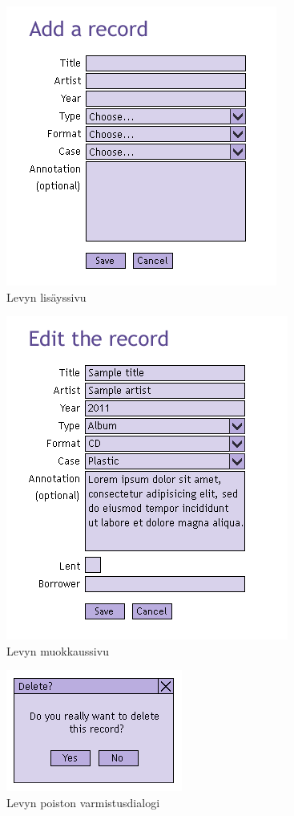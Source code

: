 \documentclass[a4paper,12pt]{report}
\begin{document}
\begin{figure}[H]
  \begin{center}
    \includegraphics[]{uidraft/addpage}
  \end{center}
  \caption{Levyn lisäyssivu}
\end{figure}

\begin{figure}[H]
  \begin{center}
    \includegraphics[]{uidraft/editpage}
  \end{center}
  \caption{Levyn muokkaussivu}
\end{figure}

\begin{figure}[H]
  \begin{center}
    \includegraphics[]{uidraft/delete}
  \end{center}
  \caption{Levyn poiston varmistusdialogi}
\end{figure}
\end{document}
